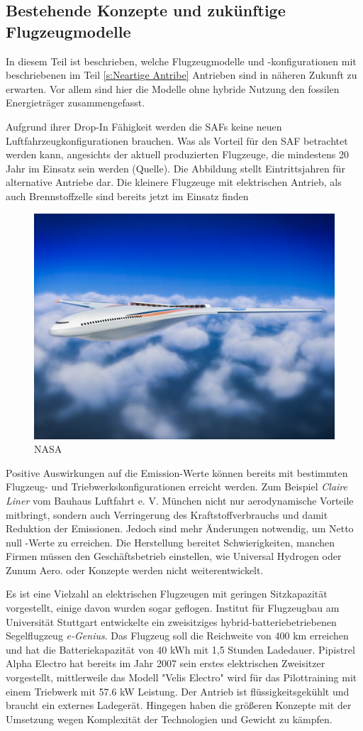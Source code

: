 \subsection{Bestehende Konzepte und zukünftige Flugzeugmodelle}
In diesem Teil ist beschrieben, welche Flugzeugmodelle und -konfigurationen mit beschriebenen im Teil \ref{s:Neartige Antribe} Antrieben
sind in näheren Zukunft zu erwarten. Vor allem sind hier die Modelle ohne hybride Nutzung den fossilen Energieträger zusammengefasst.

Aufgrund ihrer Drop-In Fähigkeit werden die SAFs keine neuen Luftfahrzeugkonfigurationen brauchen. Was als Vorteil für den SAF betrachtet werden kann,
angesichts der aktuell produzierten Flugzeuge, die mindestens 20 Jahr im Einsatz sein werden (Quelle).
Die Abbildung stellt Eintrittsjahren für alternative Antriebe dar.
Die kleinere Flugzeuge mit elektrischen Antrieb, als auch Brennstoffzelle sind bereits jetzt im Einsatz finden
%
\begin{figure}[h]
	\centering
	\includegraphics[width=0.6\linewidth]{Bilder/NASA.jpg}
	\caption[NASA]{NASA}
	\label{NASA_konfig}
\end{figure}
%
Positive Auswirkungen auf die Emission-Werte können bereits mit bestimmten Flugzeug- und Triebwerkskonfigurationen erreicht werden.
Zum Beispiel \textit{Claire Liner} vom Bauhaus Luftfahrt e. V. München nicht nur aerodynamische Vorteile mitbringt, 
sondern auch Verringerung des Kraftstoffverbrauchs und damit Reduktion der Emissionen.
Jedoch sind mehr Änderungen notwendig, um Netto null -Werte zu erreichen.
Die Herstellung bereitet Schwierigkeiten, manchen Firmen müssen den Geschäftsbetrieb einstellen, wie Universal Hydrogen oder Zunum Aero.
oder Konzepte werden nicht weiterentwickelt.

Es ist eine Vielzahl an elektrischen Flugzeugen mit geringen Sitzkapazität vorgestellt, einige davon wurden sogar geflogen.
Institut für Flugzeugbau am Universität Stuttgart entwickelte ein zweisitziges hybrid-batteriebetriebenen Segelflugzeug \textit{e-Genius}. Das Flugzeug soll
die Reichweite von 400 km erreichen und hat die Batteriekapazität von 40 kWh mit 1,5 Stunden Ladedauer. %
Pipistrel Alpha Electro hat bereits im Jahr 2007 sein erstes elektrischen Zweisitzer vorgestellt, mittlerweile das Modell "Velis Electro" \cite{Pipistrel_VelisElectro} wird
für das Pilottraining mit einem Triebwerk mit 57.6 kW Leistung. Der Antrieb ist flüssigkeitsgekühlt und braucht ein externes Ladegerät.
Hingegen haben die größeren Konzepte mit der Umsetzung wegen Komplexität der Technologien und Gewicht zu kämpfen.\\


